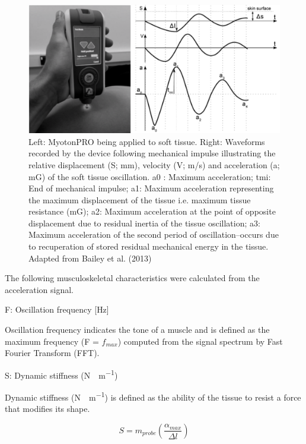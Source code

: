\documentclass[man,floatsintext]{apa6}
\begin{document}
\begin{figure}[H]

{\centering \includegraphics[width=1\linewidth]{figs/measures/myotonbigexample} 

}

\caption{Left: MyotonPRO being applied to soft tissue. Right: Waveforms recorded by the device following mechanical impulse illustrating the relative displacement (S; mm), velocity (V; m/s) and acceleration (a; mG) of the soft tissue oscillation. a0 : Maximum acceleration; tmi: End of mechanical impulse; a1: Maximum acceleration representing the maximum displacement of the tissue i.e. maximum tissue resistance (mG); a2: Maximum acceleration at the point of opposite displacement due to residual inertia of the tissue oscillation; a3: Maximum acceleration of the second period of oscillation–occurs due to recuperation of stored residual mechanical energy in the tissue. Adapted from Bailey et al. (2013)}\label{fig:myotonpro}
\end{figure}

\noindent The following musculoskeletal characteristics were calculated from the acceleration signal.

\noindent F: Oscillation frequency {[}Hz{]}

\noindent Oscillation frequency indicates the tone of a muscle and is defined as the maximum frequency (F = \(f_{max}\)) computed from the signal spectrum by Fast Fourier Transform (FFT).

\noindent S: Dynamic stiffness (\si{N\cdot m^{-1}})

\noindent Dynamic stiffness (\si{N \cdot m^{-1}}) is defined as the ability of the tissue to resist a force that modifies its shape.

\begin{equation} 
  S = m_{probe} \left(\frac{\alpha_{max}} {\Delta l}\right)
  \label{eq:stiffness}
\end{equation}
\end{document}
